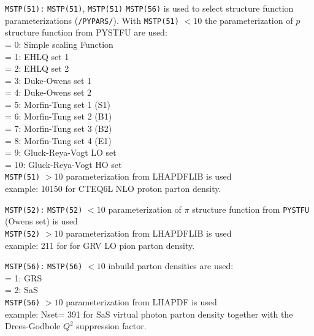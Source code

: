 \documentclass[10pt]{article} \usepackage{dina4}
\newcommand{\LHAPDFLIB}{Whalley:2005nh}
\newcommand{\deflab}[1]{#1\hfil}%
\newenvironment{defl}[1]%
  {\begin{list}{}{\settowidth{\labelwidth}{#1}%
  \setlength{\leftmargin}{\labelwidth}%
  \addtolength{\leftmargin}{\labelsep}%
  \setlength{\itemsep}{0pt plus 1pt}
  \setlength{\parsep}{0pt plus 1pt}
  \setlength{\topsep}{0pt plus 1pt}
  \setlength{\partopsep}{0pt plus 1pt}
  \setlength{\parskip}{2mm plus 1mm minus 1mm}
  \let\makelabel\deflab}}%
  {\end{list}}
\begin{document}
\begin{defl}{123456789012345}
\item[{\tt MSTP(51):}] \verb+MSTP(51)+, \verb+MSTP(51)+
                         \verb+MSTP(56)+ is used to select
                     structure function  parameterizations 
				 (\verb+/PYPARS/+). With \verb+MSTP(51)+ $<10$ 
                        the parameterization of $p$ structure function
                         from PYSTFU are used:\\
                         = 0: Simple scaling Function\\
                         = 1: EHLQ set 1 \\
                         = 2: EHLQ set 2 \\
                         = 3: Duke-Owens set 1 \\
                         = 4: Duke-Owens set 2 \\
                         = 5: Morfin-Tung set 1 (S1) \\
                         = 6: Morfin-Tung set 2 (B1) \\
                         = 7: Morfin-Tung set 3 (B2) \\
                         = 8: Morfin-Tung set 4 (E1) \\
                         = 9: Gluck-Reya-Vogt LO set \\
                         = 10: Gluck-Reya-Vogt HO set \\
                         \verb+MSTP(51)+ $>10$
                         parameterization from LHAPDFLIB 
                         \cite{\LHAPDFLIB}
                          is used \\
                             example: 10150
                             for CTEQ6L NLO proton parton density.  \\
\item[{\tt MSTP(52):}] \verb+MSTP(52)+ $<10$ 
                        parameterization of $\pi$ structure function
                         from \verb+PYSTFU+ (Owens set) is used\\
                         \verb+MSTP(52)+ $>10$ 
                         parameterization from LHAPDFLIB is used\\
                            example: 211 for 
                             for GRV LO \cite{GRVa,GRVb} 
                             pion parton density.  
\item[{\tt MSTP(56):}] \verb+MSTP(56)+ $<10$ 
                         inbuild parton densities are used:\\
                         = 1: GRS \cite{GRS}\\
				 = 2: SaS \cite{Sasgam}\\				 
                        \verb+MSTP(56)+ $>10$ 
				parameterization from LHAPDF is used\\
                            example: Nset= 391
                             for SaS \cite{Sasgam} 
                             virtual photon parton density together with
				     the Drees-Godbole $Q^2$ \cite{Drees_Godbole}
				     suppression factor.  

\end{defl}
\end{document}
